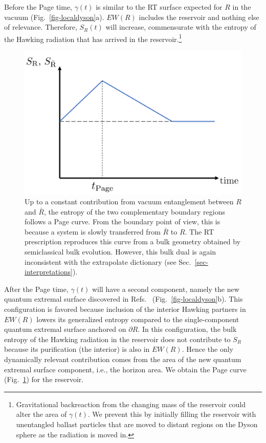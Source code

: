 \documentclass[12pt,letterpaper]{article}
\begin{document}
Before the Page time, $\gamma(t)$ is similar to the RT surface expected for $R$ in the vacuum (Fig.~\ref{fig-localdyson}a). $EW(R)$ includes the reservoir and nothing else of relevance. Therefore, $S_R(t)$ will increase, commensurate with the entropy of the Hawking radiation that has arrived in the reservoir.\footnote{Gravitational backreaction from the changing mass of the reservoir could alter the area of $\gamma(t)$. We prevent this by initially filling the reservoir with unentangled ballast particles that are moved to distant regions on the Dyson sphere as the radiation is moved in.}
\begin{figure}%
    \centering
    \includegraphics[width=.6\textwidth]{page2}
    \caption{Up to a constant contribution from vacuum entanglement between $R$ and $\bar R$, the entropy of the two complementary boundary regions follows a Page curve. From the boundary point of view, this is because a system is slowly transferred from $\bar R$ to $R$. The RT prescription reproduces this curve from a bulk geometry obtained by semiclassical bulk evolution. However, this bulk dual is again inconsistent with the extrapolate dictionary (see Sec.~\ref{sec-interpretations}).}%
    \label{fig-pagecurve}%
\end{figure}

After the Page time, $\gamma(t)$ will have a second component, namely the new quantum extremal surface discovered in Refs.~\cite{Pen19,AEMM} (Fig.~\ref{fig-localdyson}b). This configuration is favored because inclusion of the interior Hawking partners in $EW(R)$ lowers its generalized entropy compared to the single-component quantum extremal surface anchored on $\partial R$. In this configuration, the bulk entropy of the Hawking radiation in the reservoir does not contribute to $S_R$ because its purification (the interior) is also in $EW(R)$. Hence the only dynamically relevant contribution comes from the area of the new quantum extremal surface component, i.e., the horizon area. We obtain the Page curve (Fig.~\ref{fig-pagecurve}) for the reservoir.
\end{document}
